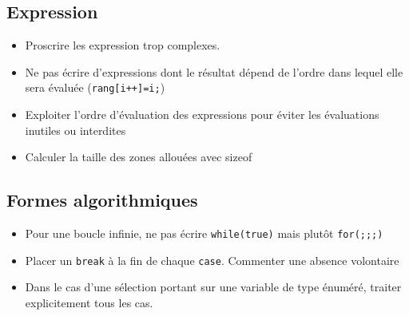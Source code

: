 \documentclass[10pt,a4paper,twoside]{article}
\begin{document}
\subsection{Expression}
\begin{itemize}
\item Proscrire les expression trop complexes.
\item Ne pas écrire d'expressions dont le résultat dépend de l'ordre dans lequel elle sera évaluée (\verb$rang[i++]=i;$)
\item Exploiter l'ordre d'évaluation des expressions pour éviter les évaluations inutiles ou interdites
\item Calculer la taille des zones allouées avec sizeof
\end{itemize}
\subsection{Formes algorithmiques}
\begin{itemize}
\item Pour une boucle infinie, ne pas écrire \verb=while(true)= mais plutôt \verb=for(;;;)=
\item Placer un \verb=break= à la fin de chaque \verb=case=. Commenter une absence volontaire
\item Dans le cas d'une sélection portant sur une variable de type énuméré, traiter explicitement tous les cas.
\end{itemize}
\end{document}
